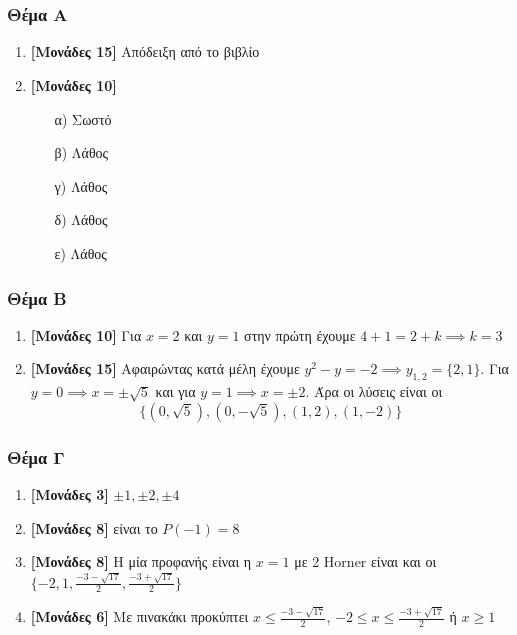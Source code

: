 \documentclass[12pt]{article}
\begin{document}
\part*{}

\section*{Θέμα Α}
  \noindent
  \begin{enumerate}
    \item \textbf{[Μονάδες 15]} Απόδειξη από το βιβλίο
    \item \textbf{[Μονάδες 10]}
    \begin{enumerate}
      \item [α)] Σωστό
      \item [β)] Λάθος
      \item [γ)] Λάθος
      \item [δ)] Λάθος
      \item [ε)] Λάθος
    \end{enumerate}
  \end{enumerate}

\section*{Θέμα Β}
  \noindent
  \begin{enumerate}
    \item \textbf{[Μονάδες 10]}  Για $x=2$ και $y=1$ στην πρώτη έχουμε $4+1=2+k \implies k=3$
    \item \textbf{[Μονάδες 15]}  Αφαιρώντας κατά μέλη έχουμε $y^2-y=-2 \implies y_{1,2}=\{2,1\}$. Για $y=0 \implies x=\pm \sqrt{5}$ και για $y=1 \implies x=\pm 2$. Άρα οι λύσεις είναι οι $$\{ (0,\sqrt{5}),(0,-\sqrt{5}),(1,2),(1,-2)\}$$
  \end{enumerate}

\section*{Θέμα Γ}
  \noindent
  \begin{enumerate}
    \item \textbf{[Μονάδες 3]} $\pm 1, \pm 2, \pm4$
    \item \textbf{[Μονάδες 8]} είναι το $P(-1)=8$
    \item \textbf{[Μονάδες 8]} Η μία προφανής είναι η $x=1$ με 2 Horner είναι και οι $\{ -2, 1, \frac{-3-\sqrt{17}}{2}, \frac{-3+\sqrt{17}}{2}\}$
    \item \textbf{[Μονάδες 6]} Με πινακάκι προκύπτει $x\le \frac{-3-\sqrt{17}}{2}$, $-2 \le x \le \frac{-3+\sqrt{17}}{2}$ ή $x \ge 1$
  \end{enumerate}
\end{document}

